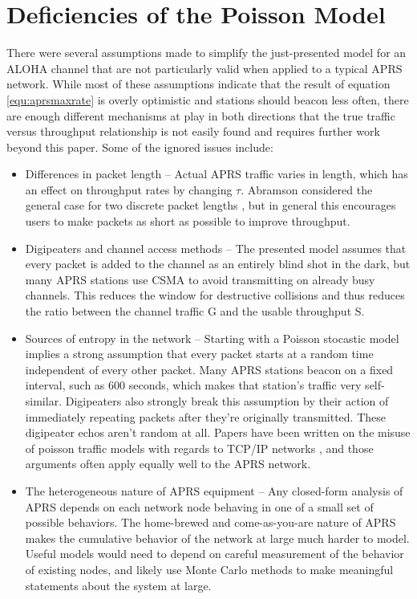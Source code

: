 \section{Deficiencies of the Poisson Model}

There were several assumptions made to simplify the just-presented model 
for an ALOHA channel that are not particularly valid 
when applied to a typical APRS network. 
While most of these assumptions indicate that the result of
equation \ref{equ:aprsmaxrate} is overly optimistic and 
stations should beacon less often, there are enough different mechanisms at play
in both directions that the true traffic versus throughput relationship 
is not easily found and requires further work beyond this paper.
Some of the ignored issues include:

\begin{itemize}
	\item Differences in packet length -- Actual APRS traffic varies in length,
		which has an effect on throughput rates by changing $\tau$.
		Abramson considered the general
		case for two discrete packet lengths \cite{packetthroughput},
		but in general this encourages users to make packets as short as possible
		to improve throughput.
	\item Digipeaters and channel access methods -- The presented model assumes that
		every packet is added to the channel as an entirely blind shot in the dark,
		but many APRS stations use CSMA to avoid transmitting on already busy channels.
		This reduces the window for destructive collisions and thus reduces the ratio
		between the channel traffic G and the usable throughput S.
	\item Sources of entropy in the network -- Starting with a Poisson stocastic model
		implies a strong assumption that every packet starts at a random time independent
		of every other packet. Many APRS stations beacon on a fixed interval,
		such as 600 seconds, which makes that station's traffic very self-similar.
		Digipeaters also strongly break this assumption by their action of immediately
		repeating packets after they're originally transmitted.
		These digipeater echos aren't random at all.
		Papers have been written on the misuse of poisson traffic models with regards
		to TCP/IP networks \cite{failureofpoisson}, and those arguments often apply
		equally well to the APRS network.
	\item The heterogeneous nature of APRS equipment -- Any closed-form analysis
		of APRS depends on each network node behaving in one of a small set 
		of possible behaviors. The home-brewed and come-as-you-are nature of APRS
		makes the cumulative behavior of the network at large much harder to model.
		Useful models would need to depend on careful measurement of the behavior of
		existing nodes, and likely use Monte Carlo methods to make meaningful
		statements about the system at large.
\end{itemize}

